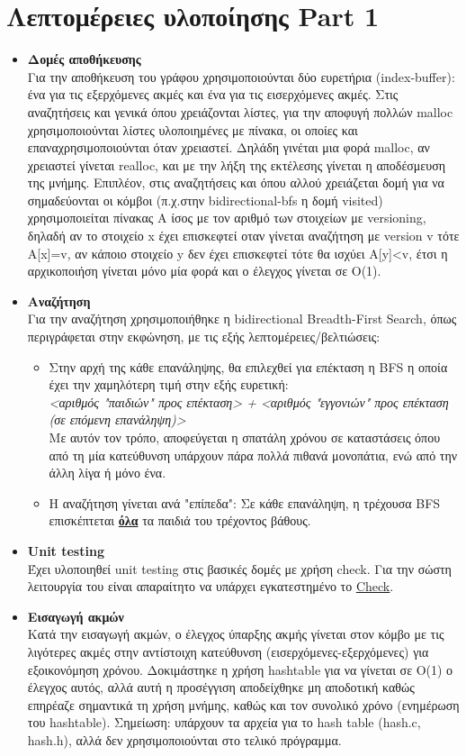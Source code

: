 \documentclass[11pt]{article}
\begin{document}
\section{Λεπτομέρειες υλοποίησης Part 1}
\begin{itemize}
\item \textbf{Δομές αποθήκευσης}\\ Για την αποθήκευση του γράφου χρησιμοποιούνται δύο ευρετήρια (index-buffer): ένα για τις εξερχόμενες ακμές και ένα για τις εισερχόμενες ακμές. Στις αναζητήσεις και γενικά όπου χρειάζονται λίστες, για την αποφυγή πολλών malloc χρησιμοποιούνται λίστες υλοποιημένες με πίνακα, οι οποίες και επαναχρησιμοποιούνται όταν χρειαστεί. Δηλάδη γινέται μια φορά malloc, αν χρειαστεί γίνεται realloc, και με την λήξη της εκτέλεσης γίνεται η αποδέσμευση της μνήμης. Επιπλέον, στις αναζητήσεις και όπου αλλού χρειάζεται δομή για να σημαδεύονται οι κόμβοι (π.χ.στην bidirectional-bfs η δομή visited) χρησιμοποιείται πίνακας A ίσος με τον αριθμό των στοιχείων με versioning, δηλαδή αν το στοιχείο x έχει επισκεφτεί οταν γίνεται αναζήτηση με version v τότε A[x]=v, αν κάποιο στοιχείο y δεν έχει επισκεφτεί τότε θα ισχύει A[y]<v, έτσι η αρχικοποιήση γίνεται μόνο μία φορά και ο έλεγχος γίνεται σε O(1).
\item \textbf{Αναζήτηση}\\ Για την αναζήτηση χρησιμοποιήθηκε η bidirectional Breadth-First Search, όπως περιγράφεται στην εκφώνηση, με τις εξής λεπτομέρειες/βελτιώσεις:
\begin{itemize}
\item Στην αρχή της κάθε επανάληψης, θα επιλεχθεί για επέκταση η BFS η οποία έχει την χαμηλότερη τιμή στην εξής ευρετική:\\
\textit{<αριθμός "παιδιών" προς επέκταση> + <αριθμός "εγγονιών" προς επέκταση (σε επόμενη επανάληψη)>}\\
Με αυτόν τον τρόπο, αποφεύγεται η σπατάλη χρόνου σε καταστάσεις όπου από τη μία κατεύθυνση υπάρχουν πάρα πολλά πιθανά μονοπάτια, ενώ από την άλλη λίγα ή μόνο ένα.
\item Η αναζήτηση γίνεται ανά "επίπεδα": Σε κάθε επανάληψη, η τρέχουσα BFS επισκέπτεται \textbf{\underline{όλα}} τα παιδιά του τρέχοντος βάθους.
\end{itemize}
\item \textbf{Unit testing}\\ Έχει υλοποιηθεί unit testing στις βασικές δομές με χρήση check. Για την σώστη λειτουργία του είναι απαραίτητο να υπάρχει εγκατεστημένο το {\color{blue}\underline{\href{https://libcheck.github.io/check/}{Check}}}.
\item \textbf{Εισαγωγή ακμών}\\ Κατά την εισαγωγή ακμών, ο έλεγχος ύπαρξης ακμής γίνεται στον κόμβο με τις λιγότερες ακμές στην αντίστοιχη κατεύθυνση (εισερχόμενες-εξερχόμενες) για εξοικονόμηση χρόνου. Δοκιμάστηκε η χρήση hashtable για να γίνεται σε O(1) ο έλεγχος αυτός, αλλά αυτή η προσέγγιση αποδείχθηκε μη αποδοτική καθώς επηρέαζε σημαντικά τη χρήση μνήμης, καθώς και τον συνολικό χρόνο (ενημέρωση του hashtable). Σημείωση: υπάρχουν τα αρχεία για το hash table (hash.c, hash.h), αλλά δεν χρησιμοποιούνται στο τελικό πρόγραμμα.
\end{itemize}
\end{document}
